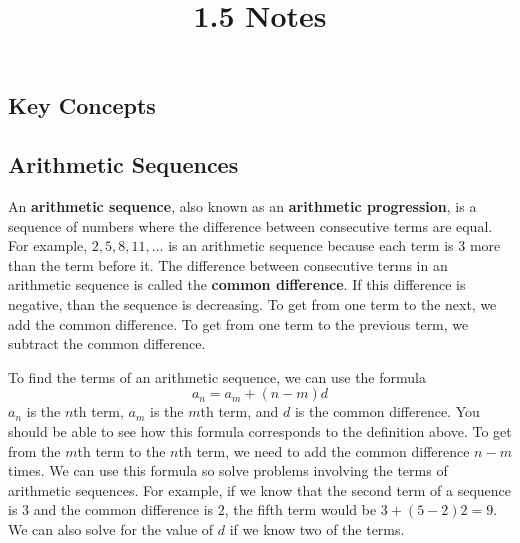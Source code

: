 \documentclass{article}
\title{1.5 Notes}
\author{}
\date{}
\begin{document}
    \maketitle

    \begin{multicols}{2}
        \section*{Key Concepts}
        \subsection*{Arithmetic Sequences}
        An \textbf{arithmetic sequence}, also known as an \textbf{arithmetic
        progression}, is a sequence of numbers where the difference between
        consecutive terms are equal. For example, $2, 5, 8, 11, \dots$ is an
        arithmetic sequence because each term is $3$ more than the term before
        it. The difference between consecutive terms in an arithmetic sequence
        is called the \textbf{common difference}. If this difference is
        negative, than the sequence is decreasing. To get from one term to the
        next, we add the common difference. To get from one term to the previous
        term, we subtract the common difference.

        To find the terms of an arithmetic sequence, we can use the formula
        \[a_n = a_m + (n - m)d\] $a_n$ is the $n$th term, $a_m$ is the $m$th
        term, and $d$ is the common difference. You should be able to see how
        this formula corresponds to the definition above. To get from the $m$th
        term to the $n$th term, we need to add the common difference $n - m$
        times. We can use this formula so solve problems involving the terms of
        arithmetic sequences. For example, if we know that the second term of a
        sequence is $3$ and the common difference is $2$, the fifth term would
        be $3 + (5 - 2)2 = 9$. We can also solve for the value of $d$ if we know
        two of the terms.


\end{multicols}
\end{document}
